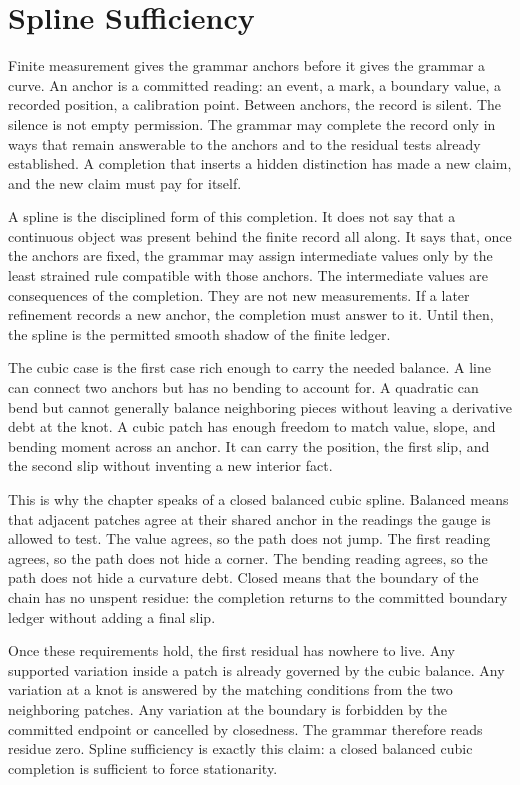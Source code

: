\section{Spline Sufficiency}

Finite measurement gives the grammar anchors before it gives the grammar a
curve. An anchor is a committed reading: an event, a mark, a boundary value,
a recorded position, a calibration point. Between anchors, the record is
silent. The silence is not empty permission. The grammar may complete the
record only in ways that remain answerable to the anchors and to the
residual tests already established. A completion that inserts a hidden
distinction has made a new claim, and the new claim must pay for itself.

A spline is the disciplined form of this completion. It does not say that a
continuous object was present behind the finite record all along. It says
that, once the anchors are fixed, the grammar may assign intermediate
values only by the least strained rule compatible with those anchors. The
intermediate values are consequences of the completion. They are not new
measurements. If a later refinement records a new anchor, the completion
must answer to it. Until then, the spline is the permitted smooth shadow of
the finite ledger.

The cubic case is the first case rich enough to carry the needed balance.
A line can connect two anchors but has no bending to account for. A
quadratic can bend but cannot generally balance neighboring pieces without
leaving a derivative debt at the knot. A cubic patch has enough freedom to
match value, slope, and bending moment across an anchor. It can carry the
position, the first slip, and the second slip without inventing a new
interior fact.

This is why the chapter speaks of a closed balanced cubic spline. Balanced
means that adjacent patches agree at their shared anchor in the readings the
gauge is allowed to test. The value agrees, so the path does not jump. The
first reading agrees, so the path does not hide a corner. The bending
reading agrees, so the path does not hide a curvature debt. Closed means
that the boundary of the chain has no unspent residue: the completion
returns to the committed boundary ledger without adding a final slip.

Once these requirements hold, the first residual has nowhere to live. Any
supported variation inside a patch is already governed by the cubic
balance. Any variation at a knot is answered by the matching conditions
from the two neighboring patches. Any variation at the boundary is
forbidden by the committed endpoint or cancelled by closedness. The grammar
therefore reads residue zero. Spline sufficiency is exactly this claim: a
closed balanced cubic completion is sufficient to force stationarity.

